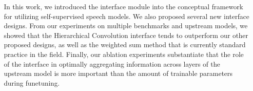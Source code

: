 In this work, we introduced the interface module into the conceptual framework for utilizing self-supervised speech models.
We also proposed several new interface designs.
From our experiments on multiple benchmarks and upstream models, we showed that the Hierarchical Convolution interface tends to outperform our other proposed designs, as well as the weighted sum method that is currently standard practice in the field.
Finally, our ablation experiments substantiate that the role of the interface in optimally aggregating information across layers of the upstream model is more important 
than the amount of trainable parameters during funetuning.

